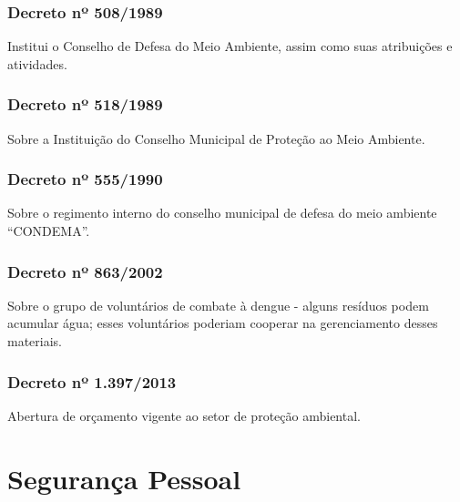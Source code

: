 \begin{subapend}
\begin{subsubapend}
		\subsubsection{Decreto nº 508/1989}
		Institui o Conselho de Defesa do Meio Ambiente, assim como suas atribuições e atividades.
		\subsubsection{Decreto nº 518/1989}
		Sobre a Instituição do Conselho Municipal de Proteção ao Meio Ambiente.
		\subsubsection{Decreto nº 555/1990}
		Sobre o regimento interno do conselho municipal de defesa do meio ambiente “CONDEMA”.
		\subsubsection{Decreto nº 863/2002}
		Sobre o grupo de voluntários de combate à dengue - alguns resíduos podem acumular água; esses voluntários poderiam cooperar na gerenciamento desses materiais.
		\subsubsection{Decreto nº 1.397/2013}
		Abertura de orçamento vigente ao setor de proteção ambiental.
	\end{subsubapend}
\end{subapend}

\section{Segurança Pessoal}

